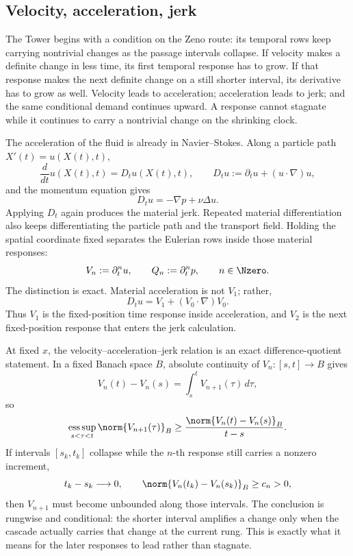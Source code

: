 \subsection{Velocity, acceleration, jerk}\label{sub:BodyFiniteTimeResponseEscalation}

The Tower begins with a condition on the Zeno route: its temporal rows keep carrying nontrivial changes as the passage intervals collapse.  If velocity makes a definite change in less time, its first temporal response has to grow.  If that response makes the next definite change on a still shorter interval, its derivative has to grow as well.  Velocity leads to acceleration; acceleration leads to jerk; and the same conditional demand continues upward.  A response cannot stagnate while it continues to carry a nontrivial change on the shrinking clock.

The acceleration of the fluid is already in Navier--Stokes.  Along a particle path \(X'(t)=u(X(t),t)\),
\[
  \frac{d}{dt}u(X(t),t)
  =D_tu(X(t),t),
  \qquad
  D_tu:=\partial_tu+(u\cdot\nabla)u,
\]
and the momentum equation gives
\begin{equation}\label{eq:MaterialAccelerationEquationBody}
  D_tu=-\nabla p+\nu\Delta u.
\end{equation}
Applying \(D_t\) again produces the material jerk.  Repeated material differentiation also keeps differentiating the particle path and the transport field.  Holding the spatial coordinate fixed separates the Eulerian rows inside those material responses:
\begin{equation}\label{eq:TemporalTowerDefinitionBody}
  V_n:=\partial_t^nu,
  \qquad
  Q_n:=\partial_t^np,
  \qquad
  n\in\Nzero.
\end{equation}
The distinction is exact.  Material acceleration is not \(V_1\); rather,
\[
  D_tu=V_1+(V_0\cdot\nabla)V_0.
\]
Thus \(V_1\) is the fixed-position time response inside acceleration, and \(V_2\) is the next fixed-position response that enters the jerk calculation.

At fixed \(x\), the velocity--acceleration--jerk relation is an exact difference-quotient statement.  In a fixed Banach space \(B\), absolute continuity of \(V_n:[s,t]\to B\) gives
\[
  V_n(t)-V_n(s)
  =\int_s^tV_{n+1}(\tau)\,d\tau,
\]
so
\begin{equation}\label{eq:BodyResponseEscalation}
  \operatorname*{ess\,sup}_{s<\tau<t}\norm{V_{n+1}(\tau)}_B
  \geq
  \frac{\norm{V_n(t)-V_n(s)}_B}{t-s}.
\end{equation}
If intervals \([s_k,t_k]\) collapse while the \(n\)-th response still carries a nonzero increment,
\[
  t_k-s_k\longrightarrow0,
  \qquad
  \norm{V_n(t_k)-V_n(s_k)}_B\geq c_n>0,
\]
then \(V_{n+1}\) must become unbounded along those intervals.  The conclusion is rungwise and conditional: the shorter interval amplifies a change only when the cascade actually carries that change at the current rung.  This is exactly what it means for the later responses to lead rather than stagnate.

